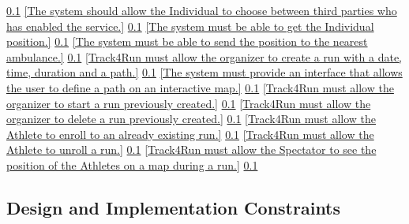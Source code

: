 \documentclass[a4paper]{article}
\begin{document}
\begin{traceabilitymatrix}
                {\ref{}}
                {}
            \con{\ref{The Individual shall be able to activate Automated-SOS service.}}
                {\ref{The system should allow the Individual to choose between third parties who has enabled the service.}}
                {\ref{}}
                {}
            \con{\ref{The Dispatcher shall be able to assign an ambulance to an incident.}}
                {\ref{The system must be able to get the Individual position.}}
                {\ref{}}
                {}
            \con{\ref{The Dispatcher shall be able to assign an ambulance to an incident.}}
                {\ref{The system must be able to send the position to the nearest ambulance.}}
                {\ref{}}
                {}
            \con{\ref{The Organizer shall be able to create a run.}}
                {\ref{Track4Run must allow the organizer to create a run with a date, time, duration and a path.}}
                {\ref{}}
                {}
            \con{\ref{The Organizer shall be able to create a run.}}
                {\ref{The system must provide an interface that allows the user to define a path on an interactive map.}}
                {\ref{}}
                {}
            \con{\ref{The Organizer should be able to start a run.}}
                {\ref{Track4Run must allow the organizer to start a run previously created.}}
                {\ref{}}
                {}
            \con{\ref{The Organizer should be able to delete a run.}}
                {\ref{Track4Run must allow the organizer to delete a run previously created.}}
                {\ref{}}
                {}
            \con{\ref{The Athlete should be able to enroll a run.}}
                {\ref{Track4Run must allow the Athlete to enroll to an already existing run.}}
                {\ref{}}
                {}
            \con{\ref{The Athlete should be able to unroll a run.}}
                {\ref{Track4Run must allow the Athlete to unroll a run.}}
                {\ref{}}
                {}
            \con{\ref{The Spectator should be able to watch a run.}}
                {\ref{Track4Run must allow the Spectator to see the position of the Athletes on a map during a run.}}
                {\ref{}}
                {}
        \end{traceabilitymatrix}
        
        \newpage
        
        \subsection{Design and Implementation Constraints}
    
\end{document}
